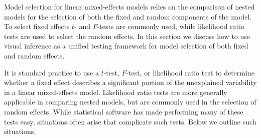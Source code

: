 \documentclass[12pt]{article} %
\newcommand{\hh}[1]{{\color{orange} #1}}
\begin{document}
 Model selection for linear mixed-effects models relies on the comparison of nested models for the selection of both the fixed and random components of the model. To select fixed effects $t$- and $F$-tests are commonly used, while likelihood ratio tests are used to select the random effects. 
 In this section we discuss how to use visual inference as a unified testing framework for model selection of both fixed and random effects.




It is standard practice to use a $t$-test, $F$-test, or likelihood ratio test to determine whether a fixed effect describes a significant portion of the unexplained variability in a linear mixed-effects model. Likelihood ratio tests are more generally applicable in comparing nested models, but are  commonly used in the selection of random effects. 
While statistical software has made performing many of these tests easy, situations often arise that complicate such tests. Below we outline such situations.
\end{document}
